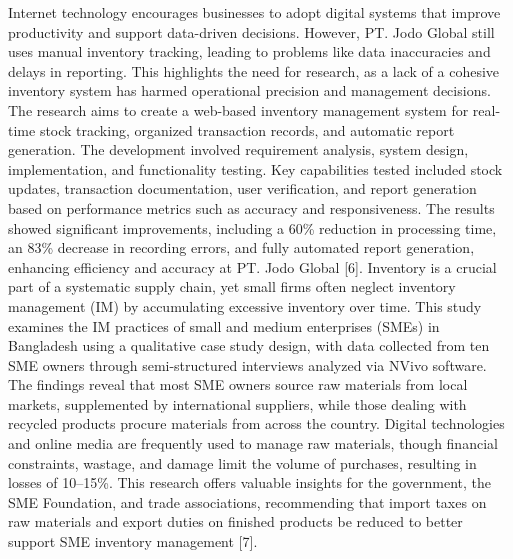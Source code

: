 \documentclass[12pt, letterpaper]{article}
\begin{document}
\hspace*{2em}Internet technology encourages businesses to adopt digital systems that improve productivity and support data-driven decisions. However, PT. Jodo Global still uses manual inventory tracking, leading to problems like data inaccuracies and delays in reporting. This highlights the need for research, as a lack of a cohesive inventory system has harmed operational precision and management decisions. The research aims to create a web-based inventory management system for real-time stock tracking, organized transaction records, and automatic report generation. The development involved requirement analysis, system design, implementation, and functionality testing. Key capabilities tested included stock updates, transaction documentation, user verification, and report generation based on performance metrics such as accuracy and responsiveness. The results showed significant improvements, including a 60\% reduction in processing time, an 83\% decrease in recording errors, and fully automated report generation, enhancing efficiency and accuracy at PT. Jodo Global [6].
\hspace*{2em}Inventory is a crucial part of a systematic supply chain, yet small firms often neglect inventory management (IM) by accumulating excessive inventory over time. This study examines the IM practices of small and medium enterprises (SMEs) in Bangladesh using a qualitative case study design, with data collected from ten SME owners through semi-structured interviews analyzed via NVivo software. The findings reveal that most SME owners source raw materials from local markets, supplemented by international suppliers, while those dealing with recycled products procure materials from across the country. Digital technologies and online media are frequently used to manage raw materials, though financial constraints, wastage, and damage limit the volume of purchases, resulting in losses of 10–15\%. This research offers valuable insights for the government, the SME Foundation, and trade associations, recommending that import taxes on raw materials and export duties on finished products be reduced to better support SME inventory management [7]. 
\end{document}
